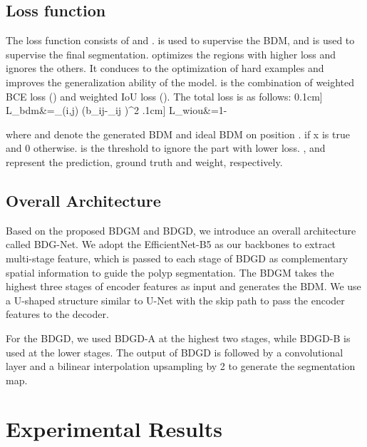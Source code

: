 \documentclass[]{spie}
\begin{document}
\subsection{Loss function}
The loss function consists of  and .  is used to supervise the BDM, and  is used to supervise the final segmentation.  optimizes the regions with higher loss and ignores the others. It conduces to the optimization of hard examples and improves the generalization ability of the model.  is the combination of weighted BCE loss () and weighted IoU loss (). The total loss is as follows:
0.1cm]
    L_{bdm}&=\sum\nolimits_{(i,j)} (b_{ij}-_{ij} )^{2}\cdot {}     
    \label{eq6}\0.1cm]
    L_{wiou}&=1-  
    \label{eq8}


\noindent where  and  denote the generated BDM and ideal BDM on position .  if x is true and 0 otherwise.  is the threshold to ignore the part with lower loss. ,  and  represent the prediction, ground truth and weight, respectively.

\subsection{Overall Architecture}
Based on the proposed BDGM and BDGD, we introduce an overall architecture called BDG-Net. We adopt the EfficientNet-B5\cite{tan2019efficientnet} as our backbones to extract multi-stage feature, which is passed to each stage of BDGD as complementary spatial information to guide the polyp segmentation. The BDGM takes the highest three stages of encoder features as input and generates the BDM. We use a U-shaped structure similar to U-Net\cite{ronneberger2015u} with the skip path to pass the encoder features to the decoder.

For the BDGD, we used BDGD-A at the highest two stages, while BDGD-B is used at the lower stages. The output of BDGD is followed by a convolutional layer and a bilinear interpolation upsampling by 2 to generate the segmentation map.


\section{Experimental Results}
\end{document}
